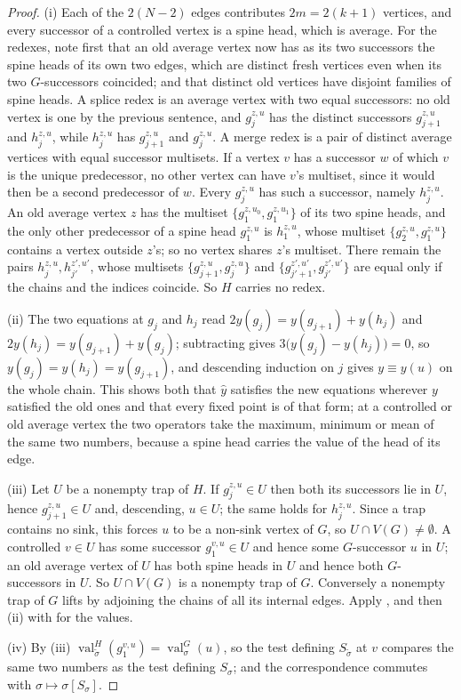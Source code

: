 \documentclass[11pt]{article}
\theoremstyle{plain}
\theoremstyle{definition}
\DeclareMathOperator{\val}{val}
\begin{document}
\begin{proof}
(i) Each of the $2(N-2)$ edges contributes $2m=2(k+1)$ vertices, and
every successor of a controlled vertex is a spine head, which is
average. For the redexes, note first that an old average vertex now has
as its two successors the spine heads of its own two edges, which are
distinct fresh vertices even when its two $G$-successors coincided; and
that distinct old vertices have disjoint families of spine heads. A
splice redex is an average vertex with two equal successors: no old
vertex is one by the previous sentence, and $g^{z,u}_j$ has the distinct
successors $g^{z,u}_{j+1}$ and $h^{z,u}_j$, while $h^{z,u}_j$ has
$g^{z,u}_{j+1}$ and $g^{z,u}_j$. A merge redex is a pair of distinct
average vertices with equal successor multisets. If a vertex $v$ has a
successor $w$ of which $v$ is the unique predecessor, no other vertex can
have $v$'s multiset, since it would then be a second predecessor of $w$.
Every $g^{z,u}_j$ has such a successor, namely $h^{z,u}_j$. An old
average vertex $z$ has the multiset $\{g^{z,u_0}_1,g^{z,u_1}_1\}$ of its
two spine heads, and the only other predecessor of a spine head
$g^{z,u}_1$ is $h^{z,u}_1$, whose multiset $\{g^{z,u}_2,g^{z,u}_1\}$
contains a vertex outside $z$'s; so no vertex shares $z$'s multiset.
There remain the pairs $h^{z,u}_j,h^{z',u'}_{j'}$, whose
multisets $\{g^{z,u}_{j+1},g^{z,u}_j\}$ and
$\{g^{z',u'}_{j'+1},g^{z',u'}_{j'}\}$ are equal only if the chains and
the indices coincide. So $H$ carries no redex.

(ii) The two equations at $g_j$ and $h_j$ read
$2y(g_j)=y(g_{j+1})+y(h_j)$ and $2y(h_j)=y(g_{j+1})+y(g_j)$; subtracting
gives $3\bigl(y(g_j)-y(h_j)\bigr)=0$, so $y(g_j)=y(h_j)=y(g_{j+1})$, and
descending induction on $j$ gives $y\equiv y(u)$ on the whole chain.
This shows both that $\hat y$ satisfies the new equations wherever $y$
satisfied the old ones and that every fixed point is of that form; at a
controlled or old average vertex the two operators take the maximum,
minimum or mean of the same two numbers, because a spine head carries
the value of the head of its edge.

(iii) Let $U$ be a nonempty trap of $H$. If $g^{z,u}_j\in U$ then both
its successors lie in $U$, hence $g^{z,u}_{j+1}\in U$ and, descending,
$u\in U$; the same holds for $h^{z,u}_j$. Since a trap contains no sink,
this forces $u$ to be a non-sink vertex of $G$, so $U\cap V(G)\ne
\emptyset$. A controlled $v\in U$ has some successor $g^{v,u}_1\in U$
and hence some $G$-successor $u$ in $U$; an old average vertex of $U$ has
both spine heads in $U$ and hence both $G$-successors in $U$. So
$U\cap V(G)$ is a nonempty trap of $G$. Conversely a nonempty trap of
$G$ lifts by adjoining the chains of all its internal edges. Apply
, and then (ii) with  for the
values.

(iv) By (iii) $\val^{H}_{\tilde\sigma}(g^{v,u}_1)=\val^{G}_\sigma(u)$, so
the test defining $S_{\tilde\sigma}$ at $v$ compares the same two numbers
as the test defining $S_\sigma$; and the correspondence commutes with
$\sigma\mapsto\sigma[S_\sigma]$.
\end{proof}
\end{document}
